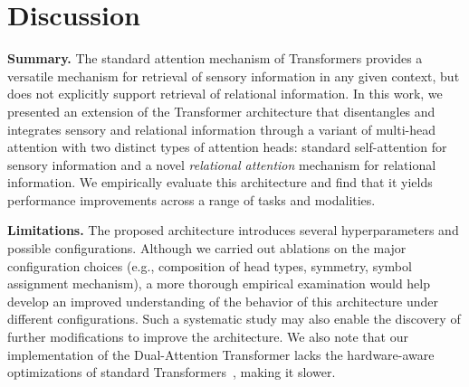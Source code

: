 \section{Discussion}\label{sec:discussion}

\textbf{Summary.} The standard attention mechanism of Transformers provides a versatile mechanism for retrieval of sensory information in any given context, but does not explicitly support retrieval of relational information. In this work, we presented an extension of the Transformer architecture that disentangles and integrates sensory and relational information through a variant of multi-head attention with two distinct types of attention heads: standard self-attention for sensory information and a novel \textit{relational attention} mechanism for relational information. We empirically evaluate this architecture and find that it yields performance improvements across a range of tasks and modalities.

\textbf{Limitations.} The proposed architecture introduces several hyperparameters and possible configurations. Although we carried out ablations on the major configuration choices (e.g., composition of head types, symmetry, symbol assignment mechanism), a more thorough empirical examination would help develop an improved understanding of the behavior of this architecture under different configurations. Such a systematic study may also enable the discovery of further modifications to improve the architecture. We also note that our implementation of the Dual-Attention Transformer lacks the hardware-aware optimizations of standard Transformers~\citep{dao2022flashattention}, making it slower.